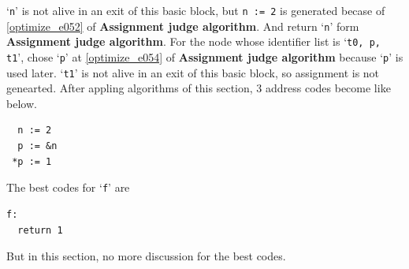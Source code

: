\begin{Example}
`{\tt{n}}' is not alive in an exit of this basic block,
but {\tt{n := 2}} is generated becase of \ref{optimize_e052}
of {\bf Assignment judge algorithm}. And return `{\tt{n}}'
form {\bf Assignment judge algorithm}.
For the node whose identifier list is `{\tt{t0, p, t1}}',
chose `{\tt{p}}' at \ref{optimize_e054} of {\bf Assignment judge
 algorithm} because `{\tt{p}}' is used later.
`{\tt{t1}}' is not alive in an exit of this basic block,
so assignment is not genearted.
After appling algorithms of this section,
3 address codes become like below.
\begin{verbatim}
  n := 2
  p := &n
 *p := 1
\end{verbatim}
The best codes for `{\tt{f}}' are
\begin{verbatim}
f:
  return 1
\end{verbatim}
But in this section, no more discussion for the best codes.
\end{Example}

